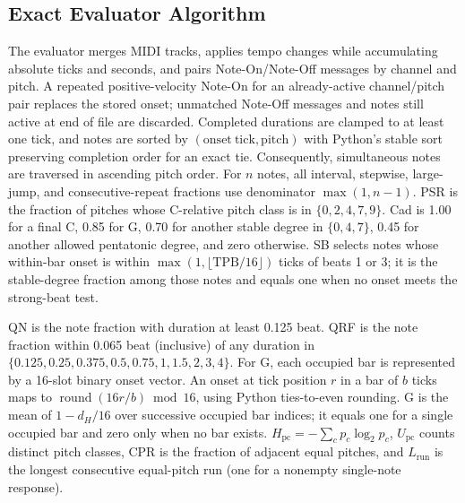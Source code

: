 \documentclass[11pt,a4paper]{article}
\begin{document}
\subsection{Exact Evaluator Algorithm}
\label{app:evaluator-specification}

The evaluator merges MIDI tracks, applies tempo changes while accumulating absolute ticks and seconds, and pairs Note-On/Note-Off messages by channel and pitch. A repeated positive-velocity Note-On for an already-active channel/pitch pair replaces the stored onset; unmatched Note-Off messages and notes still active at end of file are discarded. Completed durations are clamped to at least one tick, and notes are sorted by $(\mathrm{onset\ tick},\mathrm{pitch})$ with Python's stable sort preserving completion order for an exact tie. Consequently, simultaneous notes are traversed in ascending pitch order. For $n$ notes, all interval, stepwise, large-jump, and consecutive-repeat fractions use denominator $\max(1,n-1)$. PSR is the fraction of pitches whose C-relative pitch class is in $\{0,2,4,7,9\}$. Cad is 1.00 for a final C, 0.85 for G, 0.70 for another stable degree in $\{0,4,7\}$, 0.45 for another allowed pentatonic degree, and zero otherwise. SB selects notes whose within-bar onset is within $\max(1,\lfloor\mathrm{TPB}/16\rfloor)$ ticks of beats 1 or 3; it is the stable-degree fraction among those notes and equals one when no onset meets the strong-beat test.

QN is the note fraction with duration at least 0.125 beat. QRF is the note fraction within 0.065 beat (inclusive) of any duration in $\{0.125,0.25,0.375,0.5,0.75,1,1.5,2,3,4\}$. For G, each occupied bar is represented by a 16-slot binary onset vector. An onset at tick position $r$ in a bar of $b$ ticks maps to $\operatorname{round}(16r/b)\bmod16$, using Python ties-to-even rounding. G is the mean of $1-d_H/16$ over successive occupied bar indices; it equals one for a single occupied bar and zero only when no bar exists. $H_{\mathrm{pc}}=-\sum_c p_c\log_2p_c$, $U_{\mathrm{pc}}$ counts distinct pitch classes, CPR is the fraction of adjacent equal pitches, and $L_{\mathrm{run}}$ is the longest consecutive equal-pitch run (one for a nonempty single-note response).
\end{document}

